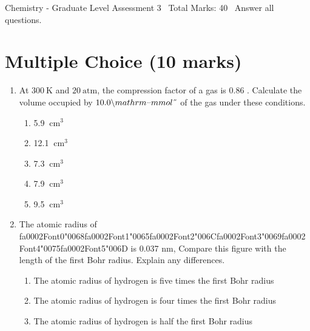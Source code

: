 \documentclass[12pt]{article}
\begin{document}
\begin{center}
Chemistry - Graduate Level Assessment 3 \
Total Marks: 40 \
Answer all questions.
\end{center}

\section*{Multiple Choice (10 marks)}
\begin{enumerate}[label=\arabic*.]
\item At $300 \mathrm{~K}$ and $20 \mathrm{~atm}$, the compression factor of a gas is 0.86 .
Calculate the volume occupied by ${\csname fa0000Font0\endcsname\char"0031}{\csname fa0000Font1\endcsname\char"0030}{\csname fa0000Font2\endcsname\char"002E}{\csname fa0000Font3\endcsname\char"0030}{\csname fa0000Font4\endcsname\char"0020}{\csname fa0000Font5\endcsname\char"005C}{\csname fa0000Font6\endcsname\char"006D}{\csname fa0000Font7\endcsname\char"0061}{\csname fa0000Font8\endcsname\char"0074} {\csname fa0001Font0\endcsname\char"0068}{\csname fa0001Font1\endcsname\char"0072}{\csname fa0001Font2\endcsname\char"006D}{\csname fa0001Font3\endcsname\char"007B}{\char"006D}{\char"006D}{\char"006F}{\char"006C}{\char"007D}$ of the gas under these conditions.
\begin{enumerate}[label=(\alph*)]
    \item 5.9 $\mathrm{~cm}^3$
    \item 12.1 $\mathrm{~cm}^3$
    \item 7.3 $\mathrm{~cm}^3$
    \item 7.9 $\mathrm{~cm}^3$
    \item 9.5 $\mathrm{~cm}^3$
\end{enumerate}
\item The atomic radius of {\csname fa0002Font0\endcsname\char"0068}{\csname fa0002Font1\endcsname\char"0065}{\csname fa0002Font2\endcsname\char"006C}{\csname fa0002Font3\endcsname\char"0069}{\csname fa0002Font4\endcsname\char"0075}{\csname fa0002Font5\endcsname\char"006D} is 0.037 nm, Compare this figure with the length of the
first Bohr radius. Explain any differences.
\begin{enumerate}[label=(\alph*)]
    \item The atomic radius of hydrogen is five times the first Bohr radius
    \item The atomic radius of hydrogen is four times the first Bohr radius
    \item The atomic radius of hydrogen is half the first Bohr radius

\end{enumerate}
\end{enumerate}
\end{document}
